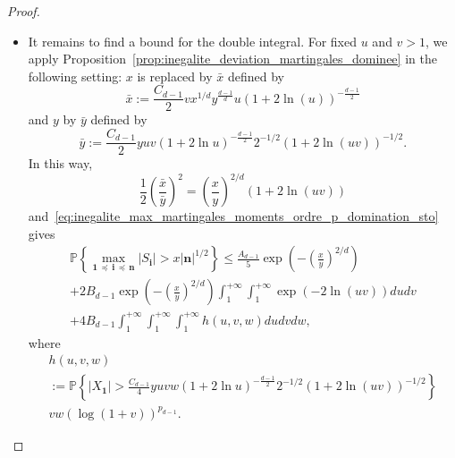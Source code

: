 \documentclass[10pt]{amsart}
\theoremstyle{definition}\newtheorem{defi}[theo]{Definition}\newtheorem{rema}[theo]{Remark}\newtheorem{exam}[theo]{Example}\newtheorem{exem}[theo]{Example}\newtheorem{nota}[theo]{Notation}
\newcommand\PP{\mathbb{P}}
\newcommand{\pr}[1]{(#1)}
\newcommand{\gr}[1]{\bm{#1}}
\newcommand{\gri}{\bm{i}}
\newcommand{\grn}{\bm{n}}
\newcommand{\imd}{\preccurlyeq}
\begin{document}
\begin{proof}
\begin{itemize}
\begin{multline}
\PP\left\{\max_{\gr{1}\,\imd\,\gri\,\imd\,\gr{n}} \left|S_{\gri}\right| >x\left|\grn\right|^{1/2}\right\} \leq
\frac{A_{d-1}}5\exp\left(-\left(\frac xy\right)^{2/d}\right)\\
+ B_{d-1}\int_1^{+\infty}\int_1^{+\infty}\PP\left\{
\left|\sum_{i_d=1}^{n_d}X_{1,\,\dots,\,1,i_d}\right|>\frac{C_{d-1}}2vn_d^{1/2}x^{1/d}y^{\frac{d-1}d}u
\left(1+2\ln\pr{ u}\right)^{-\frac{d-1}2} \right\}\\
v\left(\log\pr{1+v}\right)^{p_{d-1}}dudv.
\end{multline}
\item[\eqref{step3}] It remains to find a bound for the double integral. For fixed $u$ and $v>1$, we apply Proposition~\ref{prop:inegalite_deviation_martingales_dominee} in the following setting: $x$ is replaced by $\bar{x}$ defined by
\begin{equation}
\bar{x}:=\frac{C_{d-1}}2v x^{1/d}y^{\frac{d-1}d}u
\left(1+2\ln\pr{ u}\right)^{-\frac{d-1}2}
\end{equation}
and $y$ by $\bar{y}$ defined by
\begin{equation}
\bar{y}:= \frac{C_{d-1}}2yuv\left(1+2\ln u\right)^{-\frac{d-1}2} 2^{-1/2}\left(1+2\ln\left(uv\right)\right)^{-1/2}.
\end{equation}
In this way,
\begin{equation}
\frac 12\left(\frac{\bar{x}}{\bar{y}}\right)^2 =\left(\frac{x}y\right)^{2/d}\left(1+2\ln\left(uv\right)\right)
\end{equation}
and~\eqref{eq:inegalite_max_martingales_moments_ordre_p_domination_sto} gives
\begin{multline}\label{eq:estimated_last_step}
\PP\left\{\max_{\gr{1}\,\imd\,\gri\,\imd\,\gr{n}} \left|S_{\gri} \right| >x\left|\grn\right|^{1/2}\right\} \leq
\frac{A_{d-1}}5\exp\left(-\left(\frac xy\right)^{2/d}\right)\\+ 2B_{d-1}\exp\left(-\left(\frac{x}{y}\right)^{2/d}\right)\int_1^{+\infty}\int_1^{+\infty}
\exp\pr{-2\ln\pr{uv}}dudv\\
+ 4B_{d-1}\int_1^{+\infty}\int_1^{+\infty}\int_1^{+\infty} h\pr{u,v,w}dudvdw,
\end{multline}
where
\begin{multline}
h\pr{u,v,w}\\
{:=}\PP\left\{\left|X_{\gr{1}}\right|>
\frac{C_{d-1}}4yuvw\left(1+2\ln u\right)^{-\frac{d-1}2} 2^{-1/2}\left(1+2\ln\pr{uv}\right)^{-1/2} \right\}\\ vw\left(\log\pr{1+v}\right)^{p_{d-1}}.
\end{multline}

\end{itemize}
\end{proof}
\end{document}
